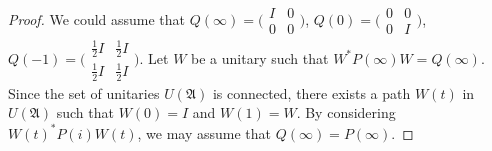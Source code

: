 \documentclass[a4paper,10pt]{amsart}
\newcommand{\AAA}{\mathfrak A}
\begin{document}
\begin{proof}
    We could assume that $Q(\infty) = \bigl(\begin{smallmatrix}
           I & 0\\
           0 & 0 
    \end{smallmatrix} \bigr)$, $Q(0) =  \bigl(\begin{smallmatrix}
           0 & 0\\
           0 & I 
    \end{smallmatrix} \bigr)$, $Q(-1) =  \bigl(\begin{smallmatrix}
            \frac{1}{2}I & \frac{1}{2}I\\
           \frac{1}{2}I & \frac{1}{2}I 
    \end{smallmatrix} \bigr)$.
    Let $W$ be a unitary such that $W^* P(\infty) W = Q(\infty)$. Since the
    set of unitaries $U(\AAA)$ is connected, there exists
    a path $W(t)$ in $U(\AAA)$ such that $W(0) = I$ and $W(1) = W$. By
    considering $W(t)^{*}P(i)W(t)$, we may assume that 
    $Q(\infty) = P(\infty)$.


\end{proof}
\end{document}
